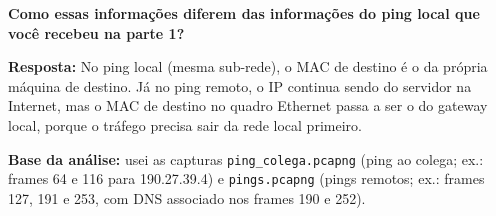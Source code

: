 \documentclass[12pt,a4paper]{article}
\newcommand{\resposta}[1]{\textbf{Resposta:} #1}
\begin{document}
\vspace{0.8em}
\noindent\textbf{Como essas informações diferem das informações do ping local que você recebeu na parte 1?}

\resposta{No ping local (mesma sub-rede), o MAC de destino é o da própria máquina de destino. Já no ping remoto, o IP continua sendo do servidor na Internet, mas o MAC de destino no quadro Ethernet passa a ser o do gateway local, porque o tráfego precisa sair da rede local primeiro.}

\vspace{1em}
\noindent\textbf{Base da análise:} usei as capturas \texttt{ping\_colega.pcapng} (ping ao colega; ex.: frames 64 e 116 para 190.27.39.4) e \texttt{pings.pcapng} (pings remotos; ex.: frames 127, 191 e 253, com DNS associado nos frames 190 e 252).
\end{document}
